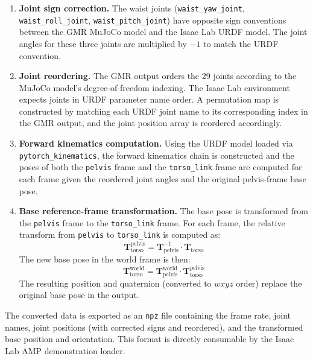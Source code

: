 \begin{enumerate}
    \item \textbf{Joint sign correction.} The waist joints (\texttt{waist\_yaw\_joint}, \texttt{waist\_roll\_joint}, \texttt{waist\_pitch\_joint}) have opposite sign conventions between the GMR MuJoCo model and the Isaac Lab URDF model. The joint angles for these three joints are multiplied by $-1$ to match the URDF convention.

    \item \textbf{Joint reordering.} The GMR output orders the 29 joints according to the MuJoCo model's degree-of-freedom indexing. The Isaac Lab environment expects joints in URDF parameter name order. A permutation map is constructed by matching each URDF joint name to its corresponding index in the GMR output, and the joint position array is reordered accordingly.

    \item \textbf{Forward kinematics computation.} Using the URDF model loaded via \texttt{pytorch\_kinematics}, the forward kinematics chain is constructed and the poses of both the \texttt{pelvis} frame and the \texttt{torso\_link} frame are computed for each frame given the reordered joint angles and the original pelvis-frame base pose.

    \item \textbf{Base reference-frame transformation.} The base pose is transformed from the \texttt{pelvis} frame to the \texttt{torso\_link} frame. For each frame, the relative transform from \texttt{pelvis} to \texttt{torso\_link} is computed as:
    \begin{equation}
        \mathbf{T}_{\text{torso}}^{\text{pelvis}} = \mathbf{T}_{\text{pelvis}}^{-1} \cdot \mathbf{T}_{\text{torso}}
    \end{equation}
    The new base pose in the world frame is then:
    \begin{equation}
        \mathbf{T}_{\text{torso}}^{\text{world}} = \mathbf{T}_{\text{pelvis}}^{\text{world}} \cdot \mathbf{T}_{\text{torso}}^{\text{pelvis}}
    \end{equation}
    The resulting position and quaternion (converted to $wxyz$ order) replace the original base pose in the output.
\end{enumerate}

The converted data is exported as an \texttt{npz} file containing the frame rate, joint names, joint positions (with corrected signs and reordered), and the transformed base position and orientation. This format is directly consumable by the Isaac Lab AMP demonstration loader.


